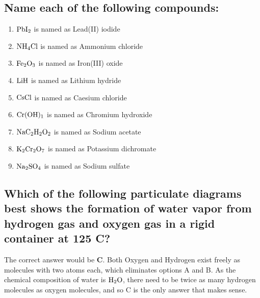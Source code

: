 \documentclass[11pt]{article}
\begin{document}
\subsection{Name each of the following compounds:}
\label{sec:org508a5b5}
\begin{enumerate}
\item \(\ce{PbI2}\) is named as Lead(II) iodide
\item \(\ce{NH4Cl}\) is named as Ammonium chloride
\item \(\ce{Fe2O3}\) is named as Iron(III) oxide
\item \(\ce{LiH}\) is named as Lithium hydride
\item \(\ce{CsCl}\) is named as Caesium chloride
\item \(\ce{Cr(OH)1}\) is named as Chromium hydroxide
\item \(\ce{NaC2H2O2}\) is named as Sodium acetate
\item \(\ce{K2Cr2O7}\) is named as Potassium dichromate
\item \(\ce{Na2SO4}\) is named as Sodium sulfate
\end{enumerate}

\subsection{Which of the following particulate diagrams best shows the formation of water vapor from hydrogen gas and oxygen gas in a rigid container at 125\textdegree{} C?}
\label{sec:org4e70f4a}
The correct answer would be \textbf{C}. Both Oxygen and Hydrogen exist freely as molecules with two atoms each, which eliminates options A and B. As the chemical composition of water is \(\ce{H2O}\), there need to be twice as many hydrogen molecules as oxygen molecules, and so C is the only answer that makes sense.
\end{document}
